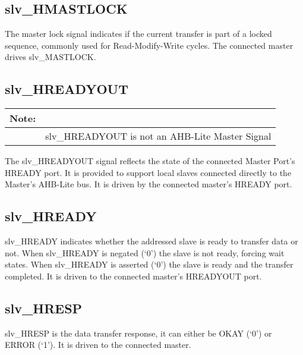 \subsection{slv\_HMASTLOCK}\label{slv_hmastlock}

The master lock signal indicates if the current transfer is part of a
locked sequence, commonly used for Read-Modify-Write cycles. The
connected master drives slv\_MASTLOCK.

\subsection{slv\_HREADYOUT}\label{slv_hreadyout}

\begin{longtable}[]{@{}|lp{12cm}@{}}
\textbf{Note:} & \\
\endhead
& slv\_HREADYOUT is not an AHB-Lite Master Signal\tabularnewline
\end{longtable}

The slv\_HREADYOUT signal reflects the state of the connected Master
Port's HREADY port. It is provided to support local slaves connected
directly to the Master's AHB-Lite bus. It is driven by the connected
master's HREADY port.

\subsection{slv\_HREADY}\label{slv_hready}

slv\_HREADY indicates whether the addressed slave is ready to transfer
data or not. When slv\_HREADY is negated (`0') the slave is not ready,
forcing wait states. When slv\_HREADY is asserted (`0') the slave is
ready and the transfer completed. It is driven to the connected master's
HREADYOUT port.

\subsection{slv\_HRESP}\label{slv_hresp}

slv\_HRESP is the data transfer response, it can either be OKAY (`0') or
ERROR (`1'). It is driven to the connected master.
